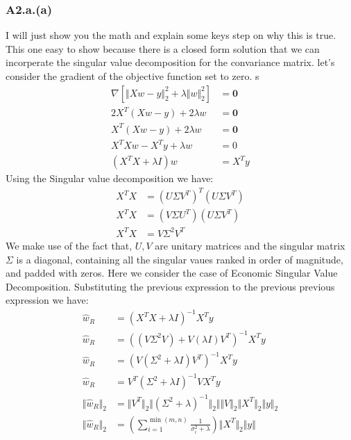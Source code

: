 \documentclass[]{article}
\begin{document}
        \subsubsection*{A2.a.(a)}\label{A2.a.a}
            I will just show you the math and explain some keys step on why this is true. This one easy to show because there is a closed form solution that we can incorperate the singular value decomposition for the convariance matrix. let's consider the gradient of the objective function set to zero. s
            \begin{align*}\tag{A2.a.a.1}\label{eqn:A2.a.a.1}
                \nabla\left[
                    \Vert Xw - y\Vert_2^2 + \lambda \Vert w \Vert_2^2
                \right] &= \mathbf{0}
                \\
                2X^T(Xw - y) + 2 \lambda w &= \mathbf{0}
                \\
                X^T(Xw - y) + 2\lambda w &= \mathbf{0}
                \\
                X^TX w - X^Ty + \lambda w &= 0
                \\
                (X^TX + \lambda I)w &= X^Ty
            \end{align*}
            Using the Singular value decomposition we have: 
            \begin{align*}\tag{A2.a.a.2}\label{eqn:A2.a.a.2}
                X^TX &= (U\Sigma V^T)^T(U\Sigma V^T)
                \\
                X^TX &= (V\Sigma U^T)(U\Sigma V^T)
                \\
                X^TX &= V\Sigma^2 V^T
            \end{align*}
            We make use of the fact that, $U, V$ are unitary matrices and the singular matrix $\Sigma$ is a diagonal, containing all the singular vaues ranked in order of magnitude, and padded with zeros. Here we consider the case of Economic Singular Value Decomposition. Substituting the previous expression to the previous previous expression we have: 
            \begin{align*}\tag{A2.a.a.3}\label{eqn:A2.a.a.3}
                \hat{w}_R &= (X^TX + \lambda I)^{-1}X^Ty 
                \\
                \hat{w}_R &= ((V\Sigma^2 V) + V(\lambda I)V^T)^{-1}X^Ty
                \\
                \hat{w}_R &= (V(\Sigma^2 + \lambda I)V^T)^{-1}X^Ty
                \\
                \hat{w}_R &= V^T(\Sigma^2 + \lambda I)^{-1}VX^Ty
                \\
                \Vert \hat{w}_R\Vert_2 &= 
                \Vert V^T \Vert_2 
                \Vert (\Sigma^2 + \lambda)^{-1} \Vert_2
                \Vert \Vert V \Vert_2
                \Vert X^T\Vert_2 
                \Vert y\Vert_2
                \\
                \Vert \hat{w}_R\Vert_2 &= \left(\sum_{i = 1}^{\min(m, n)} \frac{1}{\sigma^2_i + \lambda}\right)
                \Vert X^T\Vert_2
                \Vert y\Vert
            \end{align*}
\end{document}
